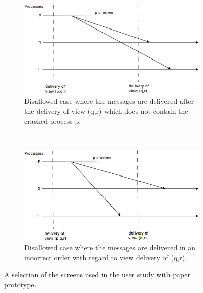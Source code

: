 \begin{figure}[h]
\begin{subfigure}[t]{0.4\textwidth}
                                        \centering
                                        \includegraphics[width=\textwidth]{img/systems-and-architectures/viewsynchronousgroupcommunication_c}
                                        \caption{Disallowed case where the messages are delivered after the delivery of view (q,r) which does not contain the crashed process p.}
                                        \label{figure:viewsynchronousgroupcommunication:c}
        \end{subfigure}
        ~
        \begin{subfigure}[t]{0.4\textwidth}
                                        \centering
                                        \includegraphics[width=\textwidth]{img/systems-and-architectures/viewsynchronousgroupcommunication_d}
                                        \caption{Disallowed case where the messages are delivered in an incorrect order with regard to view delivery of (q,r).}
                                        \label{figure:viewsynchronousgroupcommunication:d}
        \end{subfigure}
        \caption{A selection of the screens used in the user study with paper prototype.}%
        \label{figure:viewsynchronousgroupcommunication}%
\end{figure}


